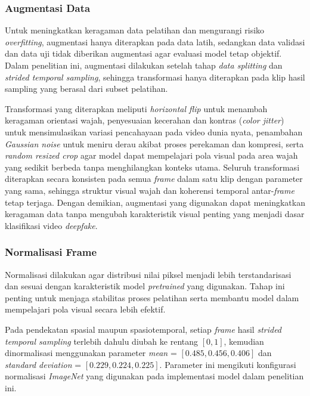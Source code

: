 \subsubsection{Augmentasi Data}
Untuk meningkatkan keragaman data pelatihan dan mengurangi risiko \textit{overfitting}, augmentasi hanya diterapkan pada data latih, sedangkan data validasi dan data uji tidak diberikan augmentasi agar evaluasi model tetap objektif. Dalam penelitian ini, augmentasi dilakukan setelah tahap \textit{data splitting} dan \textit{strided temporal sampling}, sehingga transformasi hanya diterapkan pada klip hasil sampling yang berasal dari subset pelatihan. \par 

Transformasi yang diterapkan meliputi \textit{horizontal flip} untuk menambah keragaman orientasi wajah, penyesuaian kecerahan dan kontras (\textit{color jitter}) untuk mensimulasikan variasi pencahayaan pada video dunia nyata, penambahan \textit{Gaussian noise} untuk meniru derau akibat proses perekaman dan kompresi, serta \textit{random resized crop} agar model dapat mempelajari pola visual pada area wajah yang sedikit berbeda tanpa menghilangkan konteks utama. Seluruh transformasi diterapkan secara konsisten pada semua \textit{frame} dalam satu klip dengan parameter yang sama, sehingga struktur visual wajah dan koherensi temporal antar-\textit{frame} tetap terjaga. Dengan demikian, augmentasi yang digunakan dapat meningkatkan keragaman data tanpa mengubah karakteristik visual penting yang menjadi dasar klasifikasi video \textit{deepfake}. \par

\subsubsection{Normalisasi Frame}
Normalisasi dilakukan agar distribusi nilai piksel menjadi lebih terstandarisasi dan sesuai dengan karakteristik model \textit{pretrained} yang digunakan. Tahap ini penting untuk menjaga stabilitas proses pelatihan serta membantu model dalam mempelajari pola visual secara lebih efektif. \par

Pada pendekatan spasial maupun spasiotemporal, setiap \textit{frame} hasil \textit{strided temporal sampling} terlebih dahulu diubah ke rentang $[0, 1]$, kemudian dinormalisasi menggunakan parameter \textit{mean} = $[0.485, 0.456, 0.406]$ dan \textit{standard deviation} = $[0.229, 0.224, 0.225]$. Parameter ini mengikuti konfigurasi normalisasi \textit{ImageNet} yang digunakan pada implementasi model dalam penelitian ini. \par

